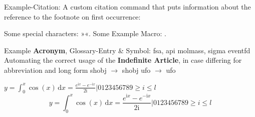 %


\label{chap:chapter1}


Example-Citation:
\cite{DenKr_denkrement1_indeco}
\nl%
A custom citation command that puts information about the reference to the footnote on first occurrence:
%

\npi%
Some special characters:
»«.
\nl%
Some Example Macro:
.

\npi%
Example \textbf{Acronym}, Glossary-Entry \& Symbol:\nl
\gls{fsa}, \gls{api}\nl
\gls{molmass}, \gls{sigma}\nl
\gls{eventfd}\nl
Automating the correct usage of the \textbf{Indefinite Article}, in case differing for abbreviation and long form\nl
{} \gls{shobj} $\rightarrow$  \gls{shobj}\nl
{} \gls{ufo} $\rightarrow$  \gls{ufo}

\np
\newcommand{\I}{\mathrm{i}}
$y = \int_0^x\cos(x)\,\mathrm{d}{x} = \frac{e^{\I x} - e^{-\I x}}{2\I} | 0123456789 \geq i \leqslant l$
\nl
\begin{equation}
y = \int_0^x\cos(x)\,\mathrm{d}{x} = \frac{e^{\I x} - e^{-\I x}}{2\I} | 0123456789 \geq i \leqslant l
\end{equation}







